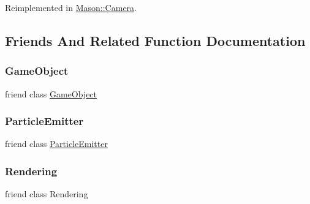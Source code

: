 Reimplemented in \hyperlink{class_mason_1_1_camera_a27ff2d3ad004a49db2ae508ac6e9d3c2}{Mason\+::\+Camera}.



\subsection{Friends And Related Function Documentation}
\hypertarget{class_mason_1_1_transform_a00df87c957d8f7ee0fc51f07a0542f4a}{}\label{class_mason_1_1_transform_a00df87c957d8f7ee0fc51f07a0542f4a} 
\subsubsection{\texorpdfstring{Game\+Object}{GameObject}}
{\footnotesize\ttfamily friend class \hyperlink{class_mason_1_1_game_object}{Game\+Object}\hspace{0.3cm}{\ttfamily [friend]}}

\hypertarget{class_mason_1_1_transform_a82b374d797a09668286ac5cf26f539f3}{}\label{class_mason_1_1_transform_a82b374d797a09668286ac5cf26f539f3} 
\subsubsection{\texorpdfstring{Particle\+Emitter}{ParticleEmitter}}
{\footnotesize\ttfamily friend class \hyperlink{class_mason_1_1_particle_emitter}{Particle\+Emitter}\hspace{0.3cm}{\ttfamily [friend]}}

\hypertarget{class_mason_1_1_transform_a33061a25b8332281d02c83e2bf1d4959}{}\label{class_mason_1_1_transform_a33061a25b8332281d02c83e2bf1d4959} 
\subsubsection{\texorpdfstring{Rendering}{Rendering}}
{\footnotesize\ttfamily friend class Rendering\hspace{0.3cm}{\ttfamily [friend]}}



